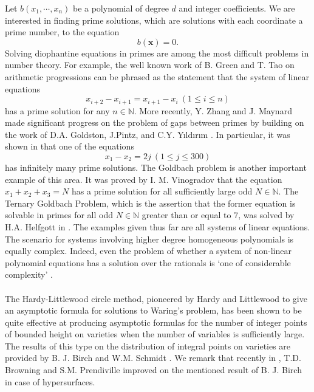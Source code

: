 \documentclass[12pt]{amsart}
\theoremstyle{definition}
\theoremstyle{remark}
\numberwithin{equation}{section}
\begin{document}
Let $b(x_1, \cdots, x_n)$ be a polynomial of degree $d$ and integer coefficients. We are interested in finding prime solutions,
which are solutions with each coordinate a prime number,
to the equation
\begin{equation}
\label{main system}
b(\mathbf{x}) = 0.
\end{equation}
Solving diophantine equations in primes are among the most difficult problems in number theory. For example, the well known work of B. Green and
T. Tao \cite{GT}
on arithmetic progressions can be phrased as the statement that the system of linear equations
$$
x_{i+2} - {x_{i+1}} = x_{i+1} - x_{i} \ (1 \leq i \leq n)
$$
has a prime solution for any $n \in \mathbb{N}$. More recently,
Y. Zhang \cite{Z} and J. Maynard \cite{M} made significant progress on the problem of gaps between primes
by building on the work of D.A. Goldston, J.Pintz, and C.Y. Y{\i}ld{\i}r{\i}m \cite{GPY}.
In particular, it was shown in \cite{M} that one of the equations
$$
x_1 - x_2 = 2j \ (1 \leq j \leq 300)
$$
has infinitely many prime solutions. The Goldbach problem is another important example of this area.
It was proved by I. M. Vinogradov \cite{V} that the equation $x_1 + x_2 + x_3 = N$ has a prime solution for
all sufficiently large odd $N \in \mathbb{N}$.
The Ternary Goldbach Problem, which is the assertion that the former equation is solvable in primes for all odd $N \in \mathbb{N}$ greater than or equal to 7, was solved by H.A. Helfgott in \cite{H1, H2}.
The examples given thus far are all systems of linear equations.
The scenario for systems involving higher degree homogeneous polynomials is equally complex.
Indeed, even the problem of whether a system of non-linear polynomial equations has a solution over the rationals is
`one of considerable complexity' \cite{BDLW}.
\\ \\
The Hardy-Littlewood circle method, pioneered by Hardy and Littlewood to give an asymptotic formula for solutions to Waring's problem, has been shown to be quite effective at producing asymptotic formulas for the number of
integer points of bounded height on varieties
when the number of variables is sufficiently large.
The results of this type on the distribution of integral points on varieties
are provided by B. J. Birch \cite{B} and W.M. Schmidt \cite{S}.
We remark that recently in \cite{BP}, T.D. Browning and S.M. Prendiville improved on the mentioned result of B. J. Birch in case of hypersurfaces.
\\ \\
\end{document}
